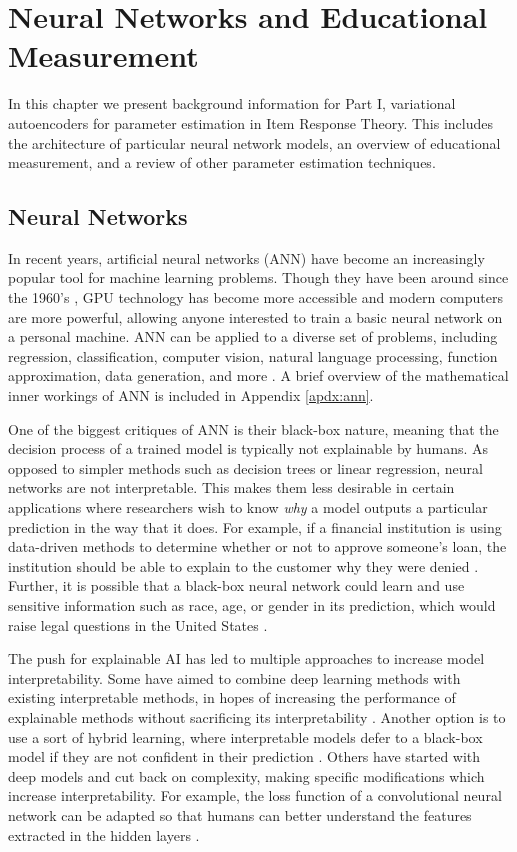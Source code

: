\chapter{Neural Networks and Educational Measurement} \label{ch:irt_background}
In this chapter we present background information for Part I, variational autoencoders for parameter estimation in Item Response Theory. This includes the architecture of particular neural network models, an overview of educational measurement, and a review of other parameter estimation techniques.

\section*{Neural Networks}
In recent years, artificial neural networks (ANN) have become an increasingly popular tool for machine learning problems. Though they have been around since the 1960's \cite{rosenblatt1961}, GPU technology has become more accessible and modern computers are more powerful, allowing anyone interested to train a basic neural network on a personal machine. ANN can be applied to a diverse set of problems, including regression, classification, computer vision, natural language processing, function approximation, data generation, and more \cite{hammerstrom1993} \cite{zhang2000}. A brief overview of the mathematical inner workings of ANN is included in Appendix \ref{apdx:ann}.

One of the biggest critiques of ANN is their black-box nature, meaning that the decision process of a trained model is typically not explainable by humans. As opposed to simpler methods such as decision trees or linear regression, neural networks are not interpretable. This makes them less desirable in certain applications where researchers wish to know \textit{why} a model outputs a particular prediction in the way that it does. For example, if a financial institution is using data-driven methods to determine whether or not to approve someone's loan, the institution should be able to explain to the customer why they were denied \cite{chou2020}. Further, it is possible that a black-box neural network could learn and use sensitive information such as race, age, or gender in its prediction, which would raise legal questions in the United States \cite{ecoa}.

The push for explainable AI has led to multiple approaches to increase model interpretability. Some have aimed to combine deep learning methods with existing interpretable methods, in hopes of increasing the performance of explainable methods without sacrificing its interpretability \cite{goebel2018}. Another option is to use a sort of hybrid learning, where interpretable models defer to a black-box model if they are not confident in their prediction \cite{rafique2020}. Others have started with deep models and cut back on complexity, making specific modifications which increase interpretability. For example, the loss function of a convolutional neural network can be adapted so that humans can better understand the features extracted in the hidden layers \cite{zhang2018interpretable}. 

